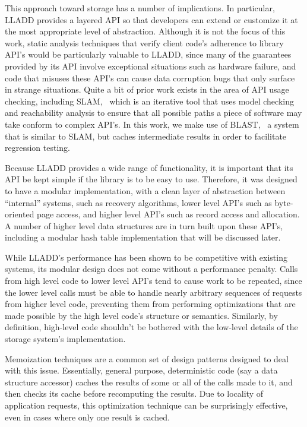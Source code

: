 \documentclass[10pt,letterpaper,twocolumn,english]{article}
\newcommand{\yad}{LLADD\xspace}
\begin{document}
This approach toward storage has a number of implications.  In
particular, \yad provides a layered API so that developers can extend
or customize it at the most appropriate level of abstraction.
Although it is not the focus of this work, static analysis techniques
that verify client code's adherence to library API's would be
particularly valuable to \yad, since many of the guarantees provided
by its API involve exceptional situations such as hardware failure,
and code that misuses these API's can cause data corruption bugs that
only surface in strange situations.  Quite a bit of prior work exists
in the area of API usage checking, including SLAM,~\cite{slam} which is an
iterative tool that uses model checking and reachability analysis to
ensure that all possible paths a piece of software may take conform to
complex API's.  In this work, we make use of BLAST,~\cite{blast} a system that is
similar to SLAM, but caches intermediate results in order to
facilitate regression testing.

Because \yad provides a wide range of functionality, it is important
that its API be kept simple if the library is to be easy to use.
Therefore, it was designed to have a modular implementation, with a
clean layer of abstraction between ``internal'' systems, such as
recovery algorithms, lower level API's such as byte-oriented page
access, and higher level API's such as record access and allocation.
A number of higher level data structures are in turn built upon these
API's, including a modular hash table implementation that will be
discussed later.
 
While \yad's performance has been shown to be competitive with
existing systems, its modular design does not come without a
performance penalty.  Calls from high level code to lower level API's
tend to cause work to be repeated, since the lower level calls must
be able to handle nearly arbitrary sequences of requests from higher
level code, preventing them from performing optimizations that are
made possible by the high level code's structure or semantics.
Similarly, by definition, high-level code shouldn't be bothered with
the low-level details of the storage system's implementation.  

Memoization techniques are a common set of design patterns designed to
deal with this issue.  Essentially, general purpose, deterministic
code (say a data structure accessor) caches the results of some or all
of the calls made to it, and then checks its cache before recomputing
the results.  Due to locality of application requests, this
optimization technique can be surprisingly effective, even in cases
where only one result is cached.
\end{document}

